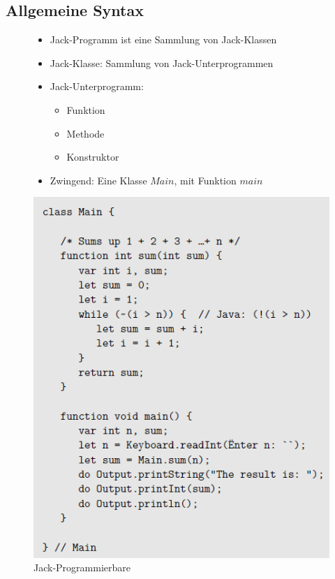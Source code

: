 \documentclass[12pt]{report}
\begin{document}
\subsection{Allgemeine Syntax}
\begin{figure}[H]
  \begin{minipage}[t]{0.45\textwidth}
    \begin{itemize}
      \item Jack-Programm ist eine Sammlung von Jack-Klassen
      \item Jack-Klasse: Sammlung von Jack-Unterprogrammen
      \item Jack-Unterprogramm:
            \begin{itemize}
              \item Funktion
              \item Methode
              \item Konstruktor
            \end{itemize}
      \item Zwingend: Eine Klasse $Main$, mit Funktion $main$
    \end{itemize}
  \end{minipage}
  \hfill
  \begin{minipage}[t]{0.45\textwidth}
    \caption{Jack-Programmierbare}
    \label{fig:jack_syntax}
    \centering
    \includegraphics[width=\textwidth]{jack_syntax}
  \end{minipage}
\end{figure}
\end{document}
